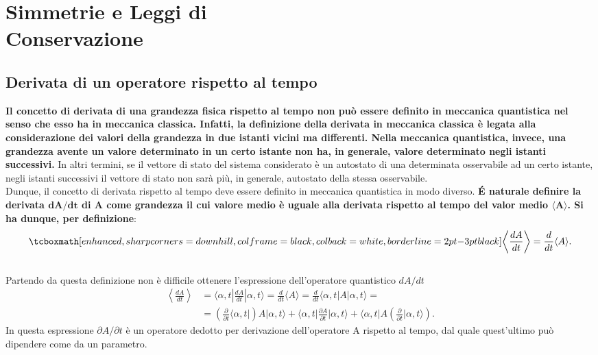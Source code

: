 \chapter[Simmetrie e Leggi di Conservazione]{Simmetrie e Leggi di\\ Conservazione} 
\section{Derivata di un operatore rispetto al tempo} 

\textbf{Il concetto di derivata di una grandezza fisica rispetto al tempo non può essere definito in meccanica quantistica nel senso che esso ha in meccanica classica. Infatti, la definizione della derivata in meccanica classica è legata alla considerazione dei valori della grandezza in due istanti vicini ma differenti. Nella meccanica quantistica, invece, una grandezza avente un valore determinato in un certo istante non ha, in generale, valore determinato negli istanti successivi.} In altri termini, se il vettore di stato del sistema considerato è un autostato di una determinata osservabile ad un certo istante, negli istanti successivi il vettore di stato non sarà più, in generale, autostato della stessa osservabile.\\

Dunque, il concetto di derivata rispetto al tempo deve essere definito in meccanica quantistica in modo diverso.
\textbf{\'E naturale definire la derivata $\mathbf{{dA}/{dt}}$ di A come grandezza il cui valore medio è uguale alla derivata rispetto al tempo del valor medio $\mathbf{\langle A \rangle} $.
Si ha dunque, per definizione}:
	\begin{equation}
		\tcboxmath[enhanced, sharp corners=downhill, colframe=black, colback=white, borderline={2pt}{-3pt}{black}]{
		\left\langle \frac{dA}{dt} \right\rangle = \frac{d}{dt} \langle A \rangle .
		}
	\end{equation}\\

Partendo da questa definizione non è difficile ottenere l'espressione dell'operatore quantistico $dA/dt$
	\begin{align}
	\label{eq:cap12_1}
	\left\langle \frac{dA}{dt} \right\rangle &= \langle \alpha,t| \frac{dA}{dt}| \alpha,t \rangle = \frac{d}{dt} \langle A \rangle = \frac{d}{dt} \langle \alpha ,t |A| \alpha ,t\rangle= \nonumber\\
	&=\left(\frac{\partial }{\partial{t}}\langle \alpha,t|\right) A|\alpha,t \rangle + \langle \alpha,t| \frac{\partial A}{\partial{t}}|\alpha,t \rangle + \langle\alpha,t|A \left(\frac{\partial }{\partial{t}}|\alpha,t\rangle\right).
	\end{align} 
In questa espressione ${\partial A}/{\partial{t}}$ è un operatore dedotto per derivazione dell'operatore A rispetto al tempo, dal quale quest'ultimo può dipendere come da un parametro.\\

